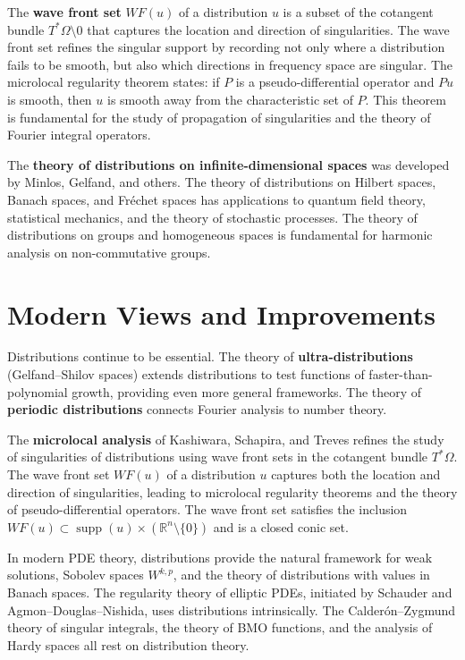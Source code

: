 The \textbf{wave front set} $WF(u)$ of a distribution $u$ is a subset of the cotangent bundle $T^*\Omega \setminus 0$ that captures the location and direction of singularities. The wave front set refines the singular support by recording not only where a distribution fails to be smooth, but also which directions in frequency space are singular. The microlocal regularity theorem states: if $P$ is a pseudo-differential operator and $Pu$ is smooth, then $u$ is smooth away from the characteristic set of $P$. This theorem is fundamental for the study of propagation of singularities and the theory of Fourier integral operators.

The \textbf{theory of distributions on infinite-dimensional spaces} was developed by Minlos, Gelfand, and others. The theory of distributions on Hilbert spaces, Banach spaces, and Fr\'echet spaces has applications to quantum field theory, statistical mechanics, and the theory of stochastic processes. The theory of distributions on groups and homogeneous spaces is fundamental for harmonic analysis on non-commutative groups.

\section{Modern Views and Improvements}

Distributions continue to be essential. The theory of \textbf{ultra-distributions} (Gelfand--Shilov spaces) extends distributions to test functions of faster-than-polynomial growth, providing even more general frameworks. The theory of \textbf{periodic distributions} connects Fourier analysis to number theory.

The \textbf{microlocal analysis} of Kashiwara, Schapira, and Treves refines the study of singularities of distributions using wave front sets in the cotangent bundle $T^*\Omega$. The wave front set $WF(u)$ of a distribution $u$ captures both the location and direction of singularities, leading to microlocal regularity theorems and the theory of pseudo-differential operators. The wave front set satisfies the inclusion $WF(u) \subset \operatorname{supp}(u) \times (\mathbb{R}^n \setminus \{0\})$ and is a closed conic set.

In modern PDE theory, distributions provide the natural framework for weak solutions, Sobolev spaces $W^{k,p}$, and the theory of distributions with values in Banach spaces. The regularity theory of elliptic PDEs, initiated by Schauder and Agmon--Douglas--Nishida, uses distributions intrinsically. The Calder\'on--Zygmund theory of singular integrals, the theory of BMO functions, and the analysis of Hardy spaces all rest on distribution theory.

